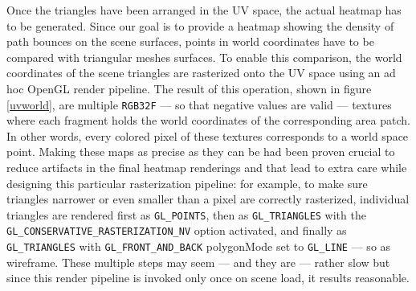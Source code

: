 Once the triangles have been arranged in the UV space, the actual heatmap has to be generated. Since our goal is to provide a heatmap showing the density of path bounces on the scene surfaces, points in world coordinates have to be compared with triangular meshes surfaces. To enable this comparison, the world coordinates of the scene triangles are rasterized onto the UV space using an ad hoc OpenGL render pipeline. The result of this operation, shown in figure \ref{uvworld}, are multiple \texttt{RGB32F} --- so that negative values are valid --- textures where each fragment holds the world coordinates of the corresponding area patch. In other words, every colored pixel of these textures corresponds to a world space point. Making these maps as precise as they can be had been proven crucial to reduce artifacts in the final heatmap renderings and that lead to extra care while designing this particular rasterization pipeline: for example, to make sure triangles narrower or even smaller than a pixel are correctly rasterized, individual triangles are rendered first as \texttt{GL\_POINTS}, then as \texttt{GL\_TRIANGLES} with the \texttt{GL\_CONSERVATIVE\_RASTERIZATION\_NV} option activated, and finally as \texttt{GL\_TRIANGLES} with \texttt{GL\_FRONT\_AND\_BACK} polygonMode set to \texttt{GL\_LINE} --- so as wireframe. These multiple steps may seem --- and they are --- rather slow but since this render pipeline is invoked only once on scene load, it results reasonable.

